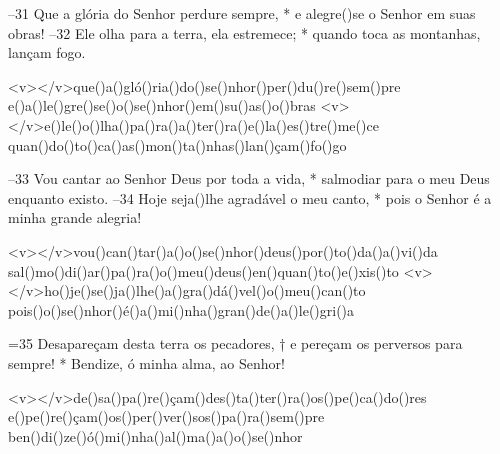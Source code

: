 –31 Que a glória do Senhor perdure sempre, *
e alegre()se o Senhor em suas obras! 
–32 Ele olha para a terra, ela estremece; *
quando toca as montanhas, lançam fogo.

<v></v>que()a()gló()ria()do()se()nhor()per()du()re()sem()pre
e()a()le()gre()se()o()se()nhor()em()su()as()o()bras
<v></v>e()le()o()lha()pa()ra()a()ter()ra()e()la()es()tre()me()ce
quan()do()to()ca()as()mon()ta()nhas()lan()çam()fo()go

–33 Vou cantar ao Senhor Deus por toda a vida, *
salmodiar para o meu Deus enquanto existo. 
–34 Hoje seja()lhe agradável o meu canto, *
pois o Senhor é a minha grande alegria!

<v></v>vou()can()tar()a()o()se()nhor()deus()por()to()da()a()vi()da
sal()mo()di()ar()pa()ra()o()meu()deus()en()quan()to()e()xis()to
<v></v>ho()je()se()ja()lhe()a()gra()dá()vel()o()meu()can()to
pois()o()se()nhor()é()a()mi()nha()gran()de()a()le()gri()a

=35 Desapareçam desta terra os pecadores, †
e pereçam os perversos para sempre! *
Bendize, ó minha alma, ao Senhor!

<v></v>de()sa()pa()re()çam()des()ta()ter()ra()os()pe()ca()do()res
e()pe()re()çam()os()per()ver()sos()pa()ra()sem()pre
ben()di()ze()ó()mi()nha()al()ma()a()o()se()nhor